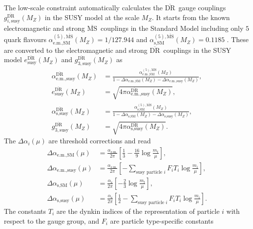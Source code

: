 \documentclass[final,3p,11pt,pdflatex]{elsarticle}
\newcommand{\textoverline}[1]{$\overline{\mbox{#1}}$}
\newcommand{\DRbar}{\textoverline{DR}\xspace}
\newcommand{\MSbar}{\textoverline{MS}\xspace}
\begin{document}
The low-scale constraint automatically calculates the \DRbar\ gauge
couplings $g_{i,\text{susy}}^{\text{\DRbar}}(M_Z)$ in the SUSY model
at the scale $M_Z$.  It starts from the known electromagnetic and
strong \MSbar\ couplings in the Standard Model including only $5$
quark flavours
$\alpha_{\text{e.m.},\text{SM}}^{(5),\text{\MSbar}}(M_Z) = 1/127.944$
and $\alpha_{\text{s},\text{SM}}^{(5),\text{\MSbar}}(M_Z) = 0.1185$
\cite{Beringer:1900zz}.  These are converted to the electromagnetic
and strong \DRbar\ couplings in the SUSY model
$e_{\text{susy}}^{\text{\DRbar}}(M_Z)$ and
$g_{3,\text{susy}}^{\text{\DRbar}}(M_Z)$ as
%
\begin{align}
  \alpha_{\text{e.m.},\text{susy}}^{\text{\DRbar}}(M_Z) &=
  \frac{\alpha_{\text{e.m.},\text{SM}}^{(5),\text{\MSbar}}(M_Z)}{1 -
    \Delta\alpha_{\text{e.m.},\text{SM}}(M_Z) -
    \Delta\alpha_{\text{e.m.},\text{susy}}(M_Z)} ,\\
    e_{\text{susy}}^{\text{\DRbar}}(M_Z) &=
    \sqrt{4\pi\alpha_{\text{e.m.},\text{susy}}^{\text{\DRbar}}(M_Z)}, \\
  \alpha_{\text{s},\text{susy}}^{\text{\DRbar}}(M_Z) &=
  \frac{\alpha_{\text{s},\text{SM}}^{(5),\text{\MSbar}}(M_Z)}{1 -
    \Delta\alpha_{\text{s},\text{SM}}(M_Z)
    - \Delta\alpha_{\text{s},\text{susy}}(M_Z)} ,\\
  g_{3,\text{susy}}^{\text{\DRbar}}(M_Z) &=
  \sqrt{4\pi\alpha_{\text{s},\text{susy}}^{\text{\DRbar}}(M_Z)} .
\end{align}
%
The $\Delta\alpha_i(\mu)$ are threshold corrections and read
%
\begin{align}
  \Delta\alpha_{\text{e.m.},\text{SM}}(\mu) &=
  \frac{\alpha_\text{e.m.}}{2\pi} \left[\frac{1}{3}
    - \frac{16}{9} \log{\frac{m_t}{\mu}} \right],\\
  \Delta\alpha_{\text{e.m.},\text{susy}}(\mu) &=
  \frac{\alpha_\text{e.m.}}{2\pi} \left[ -\sum_{\text{susy particle }
      i}
    F_i T_i \log{\frac{m_i}{\mu}} \right],\\
  \Delta\alpha_{\text{s},\text{SM}}(\mu) &=
  \frac{\alpha_\text{s}}{2\pi} \left[
    -\frac{2}{3} \log{\frac{m_t}{\mu}} \right],\\
  \Delta\alpha_{\text{s},\text{susy}}(\mu) &=
  \frac{\alpha_\text{s}}{2\pi}\left[ \frac{1}{2}-\sum_{\text{susy
        particle } i} F_i T_i \log{\frac{m_i}{\mu}} \right] .
\end{align}
%
The constants $T_i$ are the dynkin indices of the representation of
particle $i$ with respect to the gauge group, and $F_i$ are particle
type-specific constants \cite{Hall:1980kf}
\end{document}
